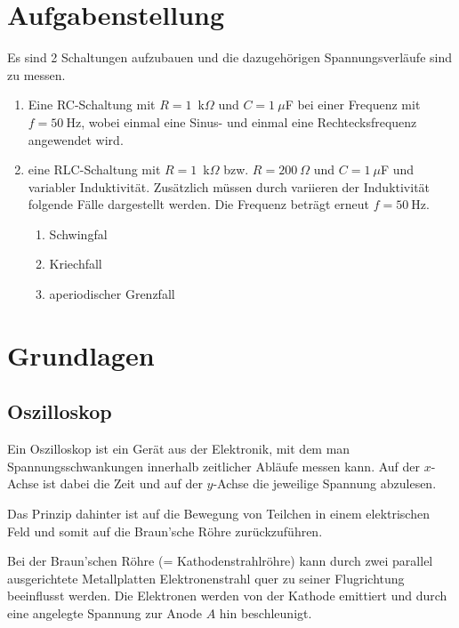 \documentclass{article}
\begin{document}
\parindent0cm




\pagestyle{fancy}

\section{Aufgabenstellung}

Es sind 2 Schaltungen aufzubauen und die dazugehörigen Spannungsverläufe sind zu messen.

\begin{enumerate}
\item Eine RC-Schaltung mit $R=1$~k$\Omega$ und $C=1~\mu$F bei  einer Frequenz mit $f=50~$Hz, wobei einmal eine Sinus- und einmal eine Rechtecksfrequenz angewendet wird.

\item eine RLC-Schaltung mit $R=1$~k$\Omega$ bzw. $R=200~\Omega$ und $C=1~\mu$F und variabler Induktivität. Zusätzlich müssen durch variieren der Induktivität folgende Fälle dargestellt werden. Die Frequenz beträgt erneut $f=50~$Hz.
\begin{enumerate}
\item Schwingfal
\item Kriechfall
\item aperiodischer Grenzfall
\end{enumerate}
\end{enumerate}




\section{Grundlagen}

\subsection{Oszilloskop}

Ein Oszilloskop ist ein Gerät aus der Elektronik, mit dem man Spannungsschwankungen innerhalb zeitlicher Abläufe messen kann. Auf der $x$-Achse ist dabei die Zeit und auf der $y$-Achse die jeweilige Spannung abzulesen.

Das Prinzip dahinter ist auf die Bewegung von Teilchen in einem elektrischen Feld und somit auf die Braun'sche Röhre zurückzuführen.

Bei der Braun'schen Röhre (= Kathodenstrahlröhre) kann durch zwei parallel ausgerichtete Metallplatten Elektronenstrahl quer zu seiner Flugrichtung beeinflusst werden. Die Elektronen werden von der Kathode emittiert und durch eine angelegte Spannung zur Anode $A$ hin beschleunigt.
\end{document}

